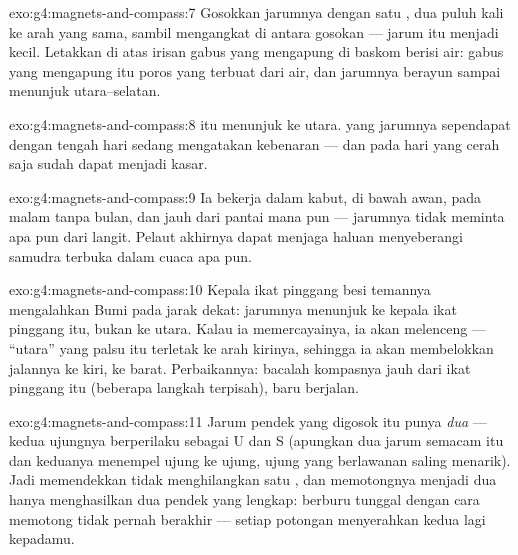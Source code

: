 \begin{solution}{exo:g4:magnets-and-compass:7}
Gosokkan jarumnya dengan satu  , dua puluh kali ke arah
yang sama, sambil mengangkat  di antara gosokan --- jarum itu
menjadi  kecil. Letakkan di atas irisan gabus yang mengapung di
baskom berisi air: gabus yang mengapung itu poros yang terbuat dari
air, dan jarumnya berayun sampai menunjuk utara--selatan.
\end{solution}

\begin{solution}{exo:g4:magnets-and-compass:8}
 itu menunjuk ke utara.  yang jarumnya sependapat
dengan  tengah hari sedang mengatakan kebenaran --- dan
pada hari yang cerah  saja sudah dapat menjadi 
kasar.
\end{solution}

\begin{solution}{exo:g4:magnets-and-compass:9}
Ia bekerja dalam kabut, di bawah awan, pada malam tanpa bulan, dan
jauh dari pantai mana pun --- jarumnya tidak meminta apa pun dari
langit. Pelaut akhirnya dapat menjaga haluan menyeberangi samudra
terbuka dalam cuaca apa pun.
\end{solution}

\begin{solution}{exo:g4:magnets-and-compass:10}
Kepala ikat pinggang besi temannya mengalahkan  Bumi pada jarak
dekat: jarumnya menunjuk ke kepala ikat pinggang itu, bukan ke utara.
Kalau ia memercayainya, ia akan melenceng --- ``utara'' yang palsu itu
terletak ke arah kirinya, sehingga ia akan membelokkan jalannya ke
kiri, ke barat. Perbaikannya: bacalah kompasnya jauh dari ikat
pinggang itu (beberapa langkah terpisah), baru berjalan.
\end{solution}

\begin{solution}{exo:g4:magnets-and-compass:11}
Jarum pendek yang digosok itu punya \emph{dua}  --- kedua
ujungnya berperilaku sebagai U dan S (apungkan dua jarum semacam itu
dan keduanya menempel ujung ke ujung, ujung yang berlawanan saling
menarik). Jadi memendekkan  tidak menghilangkan satu , dan
memotongnya menjadi dua hanya menghasilkan dua  pendek yang
lengkap: berburu  tunggal dengan cara memotong tidak pernah
berakhir --- setiap potongan menyerahkan kedua  lagi kepadamu.
\end{solution}

